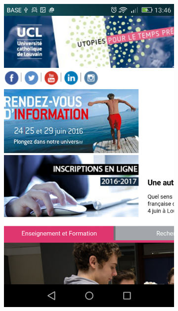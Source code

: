 \documentclass{eplmastersthesis}
\begin{document}
\begin{figure}
\begin{subfigure}[b]{0.3\textwidth}
        \includegraphics[width=\textwidth]{Images/Application_screens/Screenshot_2016-06-06-13-46-56.png}
    \end{subfigure}
\end{figure}
\end{document}
